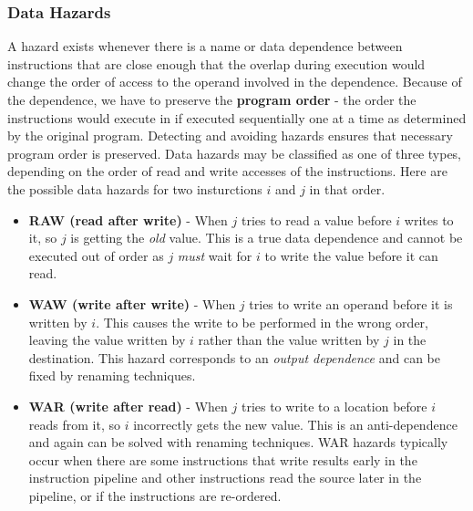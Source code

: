 \documentclass[11pt]{article}
\begin{document}
\subsubsection{Data Hazards}
A hazard exists whenever there is a name or data dependence between instructions that are close enough that the overlap during execution would change the order of access to the operand involved in the dependence. Because of the dependence, we have to preserve the \textbf{program order} - the order the instructions would execute in if executed sequentially one at a time as determined by the original program. Detecting and avoiding hazards ensures that necessary program order is preserved.
\n
Data hazards may be classified as one of three types, depending on the order of read and write accesses of the instructions. Here are the possible data hazards for two insturctions $i$ and $j$ in that order.
\begin{itemize}
\item \textbf{RAW (read after write)} - When $j$ tries to read a value before $i$ writes to it, so $j$ is getting the \textit{old} value. This is a true data dependence and cannot be executed out of order as $j$ \textit{must} wait for $i$ to write the value before it can read.
\item \textbf{WAW (write after write)} - When $j$ tries to write an operand before it is written by $i$. This causes the write to be performed in the wrong order, leaving the value written by $i$ rather than the value written by $j$ in the destination. This hazard corresponds to an \textit{output dependence} and can be fixed by renaming techniques.
\item \textbf{WAR (write after read)} - When $j$ tries to write to a location before $i$ reads from it, so $i$ incorrectly gets the new value. This is an anti-dependence and again can be solved with renaming techniques. WAR hazards typically occur when there are some instructions that write results early in the instruction pipeline and other instructions read the source later in the pipeline, or if the instructions are re-ordered.
\end{itemize}
\end{document}
